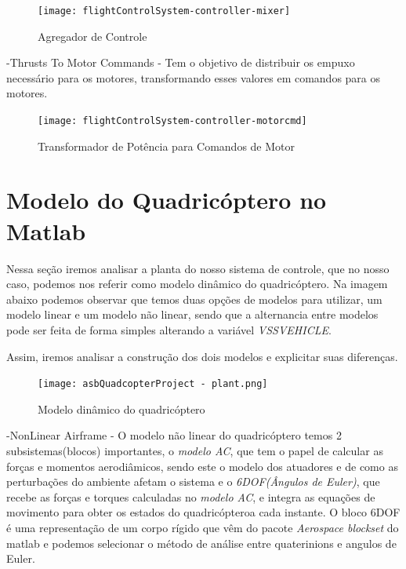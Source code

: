 \begin{figure}[H]
	\centering
	\texttt{[image: flightControlSystem-controller-mixer]}
	\caption{Agregador de Controle}
	\label{Agregador de Controle}
\end{figure}

-Thrusts To Motor Commands - Tem o objetivo de distribuir os empuxo necessário para os motores, transformando esses valores em comandos para os motores.

\begin{figure}[H]
	\centering
	\texttt{[image: flightControlSystem-controller-motorcmd]}
	\caption{Transformador de Potência para Comandos de Motor}
	\centering
	\label{Transformador de Potência para Comandos de Motor}
\end{figure}


\section{Modelo do Quadricóptero no Matlab}

Nessa seção iremos analisar a planta do nosso sistema de controle, que no nosso caso, podemos nos referir como modelo dinâmico do quadricóptero. Na imagem abaixo podemos observar que temos duas opções de modelos para utilizar, um modelo linear e um modelo não linear, sendo que a alternancia entre modelos pode ser feita de forma simples alterando a variável \textit{VSSVEHICLE}.

Assim, iremos analisar a construção dos dois modelos e explicitar suas diferenças.

\begin{figure}[H]
	\centering
	\texttt{[image: asbQuadcopterProject - plant.png]}
	\caption{Modelo dinâmico do quadricóptero}
	\centering
	\label{Modelo dinâmico do quadricóptero}
\end{figure}

-NonLinear Airframe - O modelo não linear do quadricóptero temos 2 subsistemas(blocos) importantes, o \textit{modelo AC}, que tem o papel de calcular as forças e momentos aerodiâmicos, sendo este o modelo dos atuadores e de como as perturbações do ambiente afetam o sistema e o \textit{6DOF(Ângulos de Euler)}, que recebe as forças e torques calculadas no \textit{modelo AC}, e integra as equações de movimento para obter os estados do quadricópteroa cada instante. O bloco 6DOF é uma representação de um corpo rígido que vêm do pacote  \textit{Aerospace blockset} do matlab e podemos selecionar o método de análise entre quaterinions e angulos de Euler.

